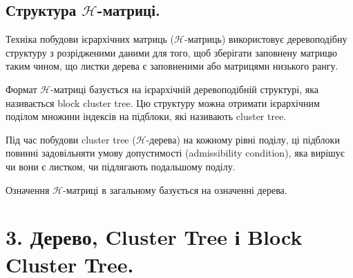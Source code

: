 \documentclass[12pt]{report}
\begin{document}
\section{Структура $\mathcal{H}$-матриці.}
	\hspace{0.8cm} Техніка побудови ієрархічних матриць ($\mathcal{H}$-матриць) використовує деревоподібну структуру з розрідженими даними для того, щоб зберігати заповнену матрицю таким чином, що листки дерева є заповненими або матрицями низького рангу. 
	\par Формат $\mathcal{H}$-матриці базується на ієрархічній деревоподібній структурі, яка називається block cluster tree. Цю структуру можна отримати ієрархічним поділом множини індексів на підблоки, які називають cluster tree.
	\par Під час побудови cluster tree ($\mathcal{H}$-дерева) на кожному рівні поділу, ці підблоки повинні задовільняти умову допустимості (admissibility condition), яка вирішує чи вони є листком, чи підлягають подальшому поділу.
	\par Означення $\mathcal{H}$-матриці в загальному базується на означенні дерева.
\chapter{3. Дерево, Cluster Tree і Block Cluster Tree.}
\end{document}
